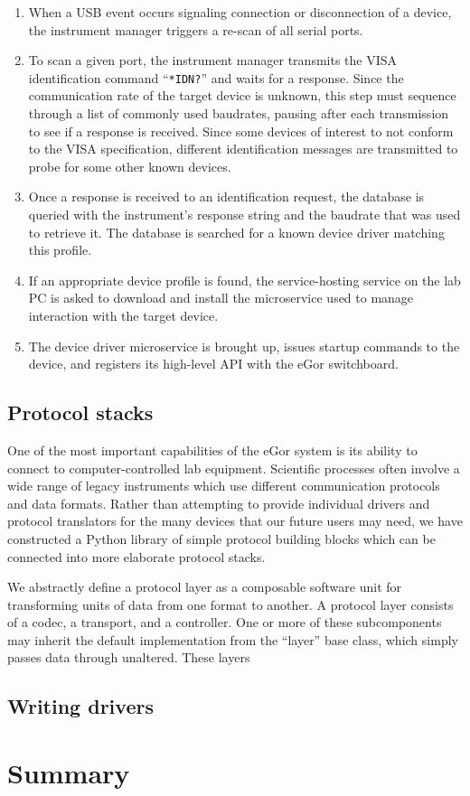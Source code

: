 \documentclass[../thesis]{subfiles}
\begin{document}
\begin{enumerate}
  \item{
      When a USB event occurs signaling connection or disconnection of
      a device, the instrument manager triggers a re-scan of all
      serial ports.
  }
  \item{
      To scan a given port, the instrument manager transmits the
      \gls{VISA} identification command ``\texttt{*IDN?}'' and waits
      for a response. Since the communication rate of the target
      device is unknown, this step must sequence through a list of
      commonly used baudrates, pausing after each transmission to see
      if a response is received. Since some devices of interest to not
      conform to the \gls{VISA} specification, different
      identification messages are transmitted to probe for some
      other known devices.
  }
  \item{
      Once a response is received to an identification request, the
      database is queried with the instrument's response string and
      the baudrate that was used to retrieve it. The database is
      searched for a known device driver matching this profile.
  }
  \item{
      If an appropriate device profile is found, the service-hosting service
      on the lab PC is asked to download and install the microservice
      used to manage interaction with the target device.
  }
  \item{
      The device driver microservice is brought up, issues startup
      commands to the device, and registers its high-level \gls{API}
      with the eGor switchboard.
  }
\end{enumerate}

\subsection{Protocol stacks}
One of the most important capabilities of the eGor system is its
ability to connect to computer-controlled lab equipment. Scientific
processes often involve a wide range of legacy instruments which use
different communication protocols and data formats. Rather than
attempting to provide individual drivers and protocol translators for
the many devices that our future users may need, we have constructed a
Python library of simple protocol building blocks which can be
connected into more elaborate protocol stacks.

We abstractly define a protocol layer as a composable software unit
for transforming units of data from one format to another. A protocol
layer consists of a codec, a transport, and a controller. One or more
of these subcomponents may inherit the default implementation from the
``layer'' base class, which simply passes data through
unaltered. These layers


\subsection{Writing drivers} \label{sec:DeviceDrivers}

\section{Summary}
\end{document}
